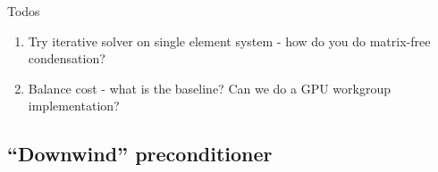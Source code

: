 \documentclass[final,leqno]{siamltex}
\begin{document}
Todos
\begin{enumerate}
\item Try iterative solver on single element system - how do you do matrix-free condensation?  
\item Balance cost - what is the baseline?  Can we do a GPU workgroup implementation?  
\end{enumerate}

\subsection{``Downwind'' preconditioner}




\end{document}
